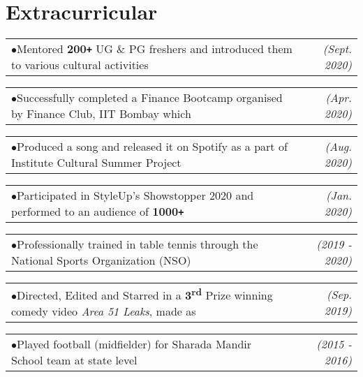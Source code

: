 \documentclass[a4paper,11pt]{article}
\makeatletter
\def\Plus{\texttt{+}}
\newcommand{\resumeSubSubheading}[2]{
    \item
    \begin{tabular*}{0.977\textwidth}{l@{\extracolsep{\fill}}r}
      \small#1 & \textit{\small #2} \\
    \end{tabular*}\vspace{-7pt}
}
\newcommand{\resumeSubHeadingListStart}{\begin{itemize}[leftmargin=-0pt, label={}]}
\newcommand{\resumeSubHeadingListEnd}{\end{itemize}}
\newcommand{\resumeItemAlt}[2]{
    \begin{tabular*}{0.977\textwidth}{l@{\extracolsep{\fill}}r}
        \tiny{$\bullet$}\hspace{7pt}\small{#1} & \textit{\footnotesize #2} \\
    \end{tabular*}
}
\newcommand{\resumeItemAltListStart}{\begin{adjustwidth}{10.8pt}{}}
\newcommand{\resumeItemAltListEnd}{\end{adjustwidth}}
\makeatother
\begin{document}



\section{Extracurricular}
\resumeItemAltListStart
	\resumeItemAlt
    {Mentored \textbf{200\Plus} UG \& PG freshers and introduced them to various cultural activities}
    {(Sept. 2020)}  
	\resumeItemAlt
    {Successfully completed a Finance Bootcamp organised by Finance Club, IIT Bombay which}
    {(Apr. 2020)}
	\vspace{-2pt} \hspace{3.75mm}{\small taught and tested the knowledge of Financial Statements, Capital Markets \& Ratio Analysis}\vspace{2pt}
	\resumeItemAlt
    {Produced a song and released it on Spotify as a part of Institute Cultural Summer Project}
    {(Aug. 2020)}
	\resumeItemAlt
    {Participated in StyleUp's Showstopper 2020 and performed to an audience of \textbf{1000\Plus}}
    {(Jan. 2020)}
	\resumeItemAlt
    {Professionally trained in table tennis through the National Sports Organization (NSO)}
    {(2019 - 2020)}
	\resumeItemAlt
    {Directed, Edited and Starred in a \textbf{3\textsuperscript{rd}} Prize winning comedy video \textit{Area 51 Leaks}, made as}
    {(Sep. 2019)}
	  \vspace{-2pt} \hspace{3.75mm}{an entry for the freshmen festival (Freshiezza)}\vspace{2pt}
	\resumeItemAlt
    {Played football (midfielder) for Sharada Mandir School team at state level}
    {(2015 - 2016)}
\resumeItemAltListEnd
\end{document}

